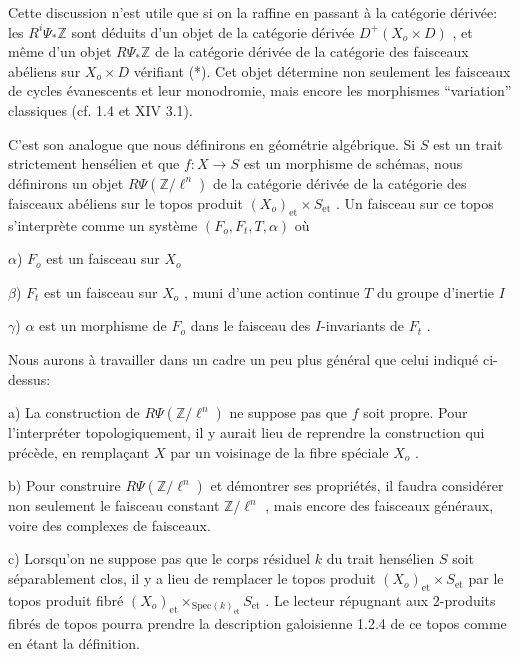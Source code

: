 
Cette discussion n'est utile que si on la raffine en passant à la catégorie dérivée: les $R^i \Psi_* \mathbb{Z}$ sont déduits d'un objet de la catégorie dérivée $D^+(X_o \times D)$ , et même d'un objet $R\Psi_* \mathbb{Z}$ de la catégorie dérivée de la catégorie des faisceaux abéliens sur $X_o \times D$ vérifiant (*). Cet objet détermine non seulement les faisceaux de cycles évanescents et leur monodromie, mais encore les morphismes ``variation'' classiques (cf. 1.4 et XIV 3.1).

C'est son analogue que nous définirons en géométrie algébrique. Si $S$ est un trait strictement hensélien et que $f : X \to S$ est un morphisme de schémas, nous définirons un objet $R\Psi(\mathbb{Z}/\ell^n)$ de la catégorie dérivée de la catégorie des faisceaux abéliens sur le topos produit $(X_o)_{\mathrm{et}} \times S_{\mathrm{et}}$ . Un faisceau sur ce topos s'interprète comme un système $(F_o, F_t, T,\alpha)$ où

$\alpha$)  $F_o$ est un faisceau sur $X_o$

$\beta$)  $F_t$ est un faisceau sur $X_o$ , muni d'une action continue $T$ du groupe d'inertie $I$

$\gamma$)  $\alpha$ est un morphisme de $F_o$ dans le faisceau des $I$-invariants de $F_t$ .

Nous aurons à travailler dans un cadre un peu plus général que celui indiqué ci-dessus:

a)  La construction de $R \Psi( \mathbb{Z} /\ell^n)$ ne suppose pas que $f$ soit propre. Pour l'interpréter topologiquement, il y aurait lieu de reprendre la construction qui précède, en remplaçant $X$ par un voisinage de la fibre spéciale $X_o$ .

b)  Pour construire $R \Psi(\mathbb{Z}/\ell^n)$ et démontrer ses propriétés, il faudra considérer non seulement le faisceau constant $\mathbb{Z}/\ell^n$ , mais encore des faisceaux généraux, voire des complexes de faisceaux.

c)  Lorsqu'on ne suppose pas que le corps résiduel $k$ du trait hensélien $S$ soit séparablement clos, il y a lieu de remplacer le topos produit $(X_o)_{\mathrm{et}} \times S_{\mathrm{et}}$ par le topos produit fibré $(X_o)_{\mathrm{et}} \times_{\mathrm{Spec}(k)_{\mathrm{et}}} S_{\mathrm{et}}$ . Le lecteur répugnant aux 2-produits fibrés de topos pourra prendre la description galoisienne 1.2.4 de ce topos comme en étant la définition.




